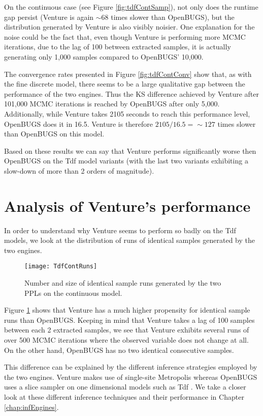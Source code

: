 On the continuous case (see Figure \ref{fig:tdfContSamp}), not only does the runtime gap persist (Venture is again $\sim$68 times slower than OpenBUGS), but the distribution generated by Venture is also visibly noisier. One explanation for the noise could be the fact that, even though Venture is performing more MCMC iterations, due to the lag of 100 between extracted samples, it is actually generating only 1,000 samples compared to OpenBUGS' 10,000. 

The convergence rates presented in Figure \ref{fig:tdfContConv} show that, as with the fine discrete model, there seems to be a large qualitative gap between the performance of the two engines. Thus the KS difference achieved by Venture after 101,000 MCMC iterations is reached by OpenBUGS after only 5,000. Additionally, while Venture takes 2105 seconds to reach this performance level, OpenBUGS does it in 16.5. Venture is therefore $2105/16.5 = \sim 127$ times slower than OpenBUGS on this model.

Based on these results we can say that Venture performs significantly worse then OpenBUGS on the Tdf model variants (with the last two variants exhibiting a slow-down of more than 2 orders of magnitude).

\section{Analysis of Venture's performance}

In order to understand why Venture seems to perform so badly on the Tdf models, we look at the distribution of runs of identical samples generated by the two engines.

\begin{figure}[h]
    \centering
    \texttt{[image: TdfContRuns]}
    \caption{Number and size of identical sample runs generated by the two PPLs on the continuous model.}
    \label{fig:tdfContRun}
\end{figure}

Figure \ref{fig:tdfContRun} shows that Venture has a much higher propensity for identical sample runs than OpenBUGS. Keeping in mind that Venture takes a lag of 100 samples between each 2 extracted samples, we see that Venture exhibits several runs of over 500 MCMC iterations where the observed variable does not change at all. On the other hand, OpenBUGS has no two identical consecutive samples.

This difference can be explained by the different inference strategies employed by the two engines. Venture makes use of single-site Metropolis whereas OpenBUGS uses a slice sampler on one dimensional models such as Tdf . We take a closer look at these different inference techniques and their performance in Chapter \ref{chap:infEngines}.

